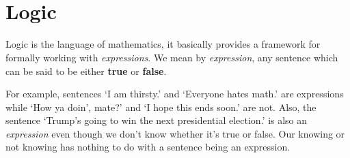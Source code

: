 \documentclass[a4paper,11pt]{article}
\title{\Huge\textsf{}\\
 \Large\textsf{ }
 \author{}
 \date{}
}
\begin{document}
\section*{Logic}

Logic is the language of mathematics, it basically provides a framework for
formally working with \emph{expressions}. We mean by \emph{expression}, any
sentence which can be said to be either \textbf{true} or \textbf{false}.

For example, sentences `I am thirsty.' and `Everyone hates math.' are
expressions while `How ya doin', mate?' and `I hope this ends soon.' are not.
Also, the sentence `Trump's going to win the next presidential election.' is
also an \emph{expression} even though we don't know whether it's true or false.
Our knowing or not knowing has nothing to do with a sentence being an
expression.
\end{document}
